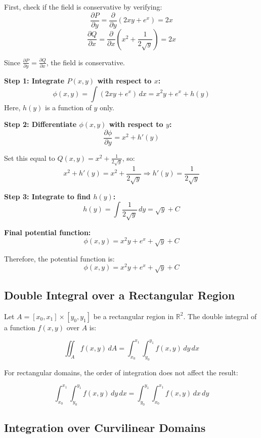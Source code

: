 First, check if the field is conservative by verifying:
\[
\frac{\partial P}{\partial y} = \frac{\partial}{\partial y}(2xy + e^x) = 2x
\]
\[
\frac{\partial Q}{\partial x} = \frac{\partial}{\partial x}\left(x^2 + \frac{1}{2\sqrt{y}}\right) = 2x
\]

Since \( \frac{\partial P}{\partial y} = \frac{\partial Q}{\partial x} \), the field is conservative.
\vspace{\baselineskip}

\textbf{Step 1: Integrate \( P(x, y) \) with respect to \( x \):}
\[
\phi(x, y) = \int (2xy + e^x)\,dx = x^2y + e^x + h(y)
\]
Here, \( h(y) \) is a function of \( y \) only.
\vspace{\baselineskip}

\textbf{Step 2: Differentiate \( \phi(x, y) \) with respect to \( y \):}
\[
\frac{\partial \phi}{\partial y} = x^2 + h'(y)
\]

Set this equal to \( Q(x, y) = x^2 + \frac{1}{2\sqrt{y}} \), so:
\[
x^2 + h'(y) = x^2 + \frac{1}{2\sqrt{y}} \Rightarrow h'(y) = \frac{1}{2\sqrt{y}}
\]

\textbf{Step 3: Integrate to find \( h(y) \):}
\[
h(y) = \int \frac{1}{2\sqrt{y}}\,dy = \sqrt{y} + C
\]

\textbf{Final potential function:}
\[
\phi(x, y) = x^2y + e^x + \sqrt{y} + C
\]

Therefore, the potential function is:
\[
\boxed{\phi(x, y) = x^2y + e^x + \sqrt{y} + C}
\]


\subsection{Double Integral over a Rectangular Region}

Let \( A = [x_0, x_1] \times [y_0, y_1] \) be a rectangular region in \( \mathbb{R}^2 \). The double integral of a function \( f(x, y) \) over \( A \) is:

\[
\iint_A f(x, y)\, dA = \int_{x_0}^{x_1} \int_{y_0}^{y_1} f(x, y)\, dy\, dx
\]

For rectangular domains, the order of integration does not affect the result:

\[
\int_{x_0}^{x_1} \int_{y_0}^{y_1} f(x, y)\, dy\, dx = \int_{y_0}^{y_1} \int_{x_0}^{x_1} f(x, y)\, dx\, dy
\]


\subsection{Integration over Curvilinear Domains}

